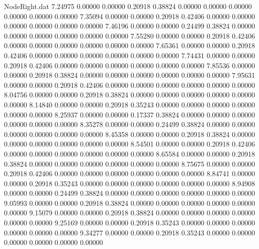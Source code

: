 \begin{filecontents}{NodeRight.dat}
   7.24975    0.00000    0.00000     0.20918    0.38824    0.00000    0.00000    0.00000    0.00000    0.00000    0.00000
   7.35094    0.00000    0.00000     0.20918    0.42406    0.00000    0.00000    0.00000    0.00000    0.00000    0.00000
   7.46196    0.00000    0.00000     0.24499    0.38824    0.00000    0.00000    0.00000    0.00000    0.00000    0.00000
   7.55280    0.00000    0.00000     0.20918    0.42406    0.00000    0.00000    0.00000    0.00000    0.00000    0.00000
   7.65361    0.00000    0.00000     0.20918    0.42406    0.00000    0.00000    0.00000    0.00000    0.00000    0.00000
   7.74431    0.00000    0.00000     0.20918    0.42406    0.00000    0.00000    0.00000    0.00000    0.00000    0.00000
   7.85536    0.00000    0.00000     0.20918    0.38824    0.00000    0.00000    0.00000    0.00000    0.00000    0.00000
   7.95631    0.00000    0.00000     0.20918    0.42406    0.00000    0.00000    0.00000    0.00000    0.00000    0.00000
   8.04756    0.00000    0.00000     0.20918    0.38824    0.00000    0.00000    0.00000    0.00000    0.00000    0.00000
   8.14840    0.00000    0.00000     0.20918    0.35243    0.00000    0.00000    0.00000    0.00000    0.00000    0.00000
   8.25937    0.00000    0.00000     0.17337    0.38824    0.00000    0.00000    0.00000    0.00000    0.00000    0.00000
   8.35278    0.00000    0.00000     0.24499    0.38824    0.00000    0.00000    0.00000    0.00000    0.00000    0.00000
   8.45358    0.00000    0.00000     0.20918    0.38824    0.00000    0.00000    0.00000    0.00000    0.00000    0.00000
   8.54501    0.00000    0.00000     0.20918    0.42406    0.00000    0.00000    0.00000    0.00000    0.00000    0.00000
   8.65584    0.00000    0.00000     0.20918    0.38824    0.00000    0.00000    0.00000    0.00000    0.00000    0.00000
   8.75675    0.00000    0.00000     0.20918    0.42406    0.00000    0.00000    0.00000    0.00000    0.00000    0.00000
   8.84741    0.00000    0.00000     0.20918    0.35243    0.00000    0.00000    0.00000    0.00000    0.00000    0.00000
   8.94908    0.00000    0.00000     0.24499    0.38824    0.00000    0.00000    0.00000    0.00000    0.00000    0.00000
   9.05993    0.00000    0.00000     0.20918    0.38824    0.00000    0.00000    0.00000    0.00000    0.00000    0.00000
   9.15079    0.00000    0.00000     0.20918    0.38824    0.00000    0.00000    0.00000    0.00000    0.00000    0.00000
   9.25169    0.00000    0.00000     0.20918    0.35243    0.00000    0.00000    0.00000    0.00000    0.00000    0.00000
   9.34277    0.00000    0.00000     0.20918    0.35243    0.00000    0.00000    0.00000    0.00000    0.00000    0.00000

\end{filecontents}
